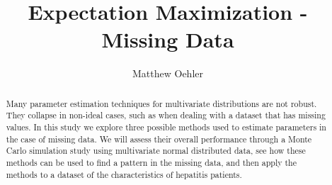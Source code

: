 \documentclass{svproc}
\begin{document}
\mainmatter              %
%
\title{Expectation Maximization - Missing Data}
%
%
\author{Matthew Oehler}

%
%

\maketitle              %

\begin{abstract}
Many parameter estimation techniques for multivariate distributions are not robust. They collapse in non-ideal cases, such as when dealing with a dataset that has missing values. In this study we explore three possible methods used to estimate parameters in the case of missing data. We will assess their overall performance through a Monte Carlo simulation study using multivariate normal distributed data, see how these methods can be used to find a pattern in the missing data, and then apply the methods to a dataset of the characteristics of hepatitis patients.
\end{abstract}

\end{document}
